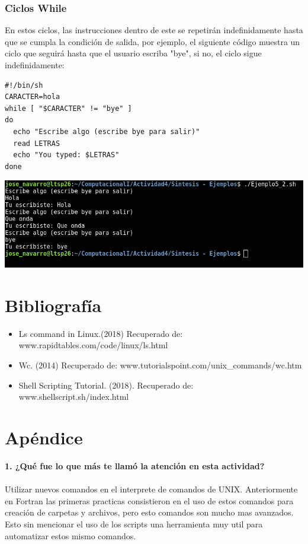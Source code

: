 \documentclass[12pt]{article}
\begin{document}
\subsubsection{Ciclos While}
En estos ciclos, las instrucciones dentro de este se repetirán indefinidamente hasta que se cumpla la condición de salida, por ejemplo, el siguiente código muestra un ciclo que seguirá hasta que el usuario escriba "bye", si no, el ciclo sigue indefinidamente: 

\begin{verbatim}
#!/bin/sh
CARACTER=hola
while [ "$CARACTER" != "bye" ]
do
  echo "Escribe algo (escribe bye para salir)"
  read LETRAS
  echo "You typed: $LETRAS"
done
\end{verbatim}

\begin{center}
\includegraphics[scale=0.5]{Ej5_2.png}
\end{center} 

\section{Bibliografía}
\begin{itemize}
    \item Ls command in Linux.(2018) Recuperado de: www.rapidtables.com/code/linux/ls.html
    \item Wc. (2014) Recuperado de: www.tutorialspoint.com/unix\_commands/wc.htm
    \item Shell Scripting Tutorial. (2018). Recuperado de: www.shellscript.sh/index.html
\end{itemize}

\section{Apéndice}
\noindent\textbf {1. ¿Qué fue lo que más te llamó la atención en esta actividad?} \\ \\
Utilizar nuevos comandos en el interprete de comandos de UNIX. Anteriormente en Fortran las primeras practicas consistieron en el uso de estos comandos para creación de carpetas y archivos, pero esto comandos son mucho mas avanzados. Esto sin mencionar el uso de los scripts una herramienta muy util para automatizar estos mismo comandos. \\
\end{document}
